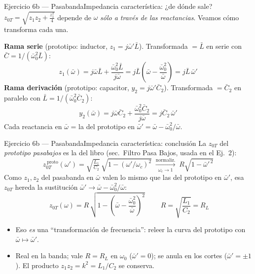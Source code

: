 \documentclass[10pt, aspectratio=169]{beamer}
\begin{document}
\begin{frame}{Ejercicio 6b --- Pasabanda}{Impedancia característica: ¿de dónde sale?}
  $z_{0T}=\sqrt{z_1 z_2+\frac{z_1^2}{4}}$ depende de $\omega$ \emph{sólo a través de las
  reactancias}. Veamos cómo transforma cada una.

  \textbf{Rama serie} (prototipo: inductor, $z_1=j\bar\omega'\bar L$). Transformada
  $=\bar L$ en serie con $\bar C=1/(\bar\omega_0^2\bar L)$:
  \[
      z_1(\bar\omega) = j\bar\omega\bar L + \frac{\bar\omega_0^2\bar L}{j\bar\omega}
      = j\bar L\left(\bar\omega-\frac{\bar\omega_0^2}{\bar\omega}\right) = j\bar L\,\bar\omega'
  \]
  \textbf{Rama derivación} (prototipo: capacitor, $y_2=j\bar\omega'\bar C_2$).
  Transformada $=\bar C_2$ en paralelo con $\bar L=1/(\bar\omega_0^2\bar C_2)$:
  \[
      y_2(\bar\omega) = j\bar\omega\bar C_2 + \frac{\bar\omega_0^2\bar C_2}{j\bar\omega}
      = j\bar C_2\,\bar\omega'
  \]
  \alert{Cada reactancia en $\bar\omega$ = la del prototipo en $\bar\omega'=\bar\omega-\bar\omega_0^2/\bar\omega$.}
\end{frame}

\begin{frame}{Ejercicio 6b --- Pasabanda}{Impedancia característica: conclusión}
  La $z_{0T}$ del \emph{prototipo pasabajos} es la del libro (sec.\ Filtro Pasa Bajos,
  usada en el Ej.~2):
  \[
      z_{0T}^{\,\text{proto}}(\omega') = \sqrt{\tfrac{L_1}{C_2}}\,\sqrt{1-(\omega'/\omega_c)^2}
      \;\xrightarrow[\;\omega_c\to1\;]{\text{normaliz.}}\; R\sqrt{1-\bar\omega'^{\,2}}
  \]
  Como $z_1,z_2$ del pasabanda en $\bar\omega$ valen lo mismo que las del prototipo en
  $\bar\omega'$, esa $z_{0T}$ hereda la sustitución $\bar\omega'\to\bar\omega-\bar\omega_0^2/\bar\omega$:
  \[
      \boxed{\;z_{0T}(\omega) = R\,\sqrt{1-\left(\bar\omega - \frac{\bar\omega_0^2}{\bar\omega}\right)^{\!2}}\;}
      \qquad R = \sqrt{\frac{L_1}{C_2}} = R_L
  \]
  \begin{itemize}\setlength{\itemsep}{1ex}
    \item Eso \emph{es} una ``transformación de frecuencia'': releer la curva del
          prototipo con $\bar\omega\mapsto\bar\omega'$.
    \item Real en la banda; vale $R=R_L$ en $\omega_0$ ($\bar\omega'=0$); se anula en
          los cortes ($\bar\omega'=\pm1$). El producto $z_1 z_2=k^2=L_1/C_2$ se conserva.
  \end{itemize}
\end{frame}

\end{document}
